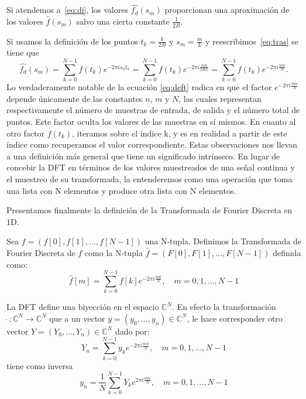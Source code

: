 \noindent Si atendemos a~\eqref{eq:di}, los valores $\widehat{f_d}(s_m)$ proporcionan una aproximación de los valores $\widehat{f}(s_m)$ salvo una cierta constante  $\frac{1}{2B}$.

\noindent Si usamos la definición de los puntos $t_k = \frac{k}{2B}$ y $s_m = \frac{m}{L}$ y reescribimos~\eqref{eq:tras} se tiene que 
\begin{equation}\label{eq:deft}
     \widehat{f_d}(s_m) = \sum_{k=0}^{N-1} f(t_k) e^{-2\pi i s_n t_k} = \sum_{k=0}^{N-1} f(t_k) e^{-2\pi i \frac{nm}{2BL}} = \sum_{k=0}^{N-1} f(t_k) e^{-2\pi i \frac{nm}{N}}.
\end{equation}
Lo verdaderamente notable de la ecuación \eqref{eq:deft} radica en que el factor $e^{-2\pi i \frac{nm}{N}}$ depende únicamente de las constantes $n$, $m$ y $N$, las cuales representan respectivamente el número de muestras de entrada, de salida y el número total de puntos. Este factor oculta los valores de las muestras en sí mismos. En cuanto al otro factor $f(t_k)$, iteramos sobre el índice k, y es en realidad a partir de este índice como recuperamos el valor correspondiente. Estas observaciones nos llevan a una definición más general que tiene un significado intrínseco. En lugar de concebir la DFT en términos de los valores muestreados de una señal continua y el muestreo de su transformada, la entenderemos como una operación que toma una lista con N elementos y produce otra lista con N elementos. 

\noindent Presentamos finalmente la definición de la Transformada de Fourier Discreta en 1D.

\begin{definicion}  \label{def:tfd} 
Sea $f = (f[0],f[1],\ldots,f[N-1])$ una N-tupla. Definimos la Transformada de Fourier Discreta de $f$ como la N-tupla $\widehat{f} = (F[0],F[1],\ldots,F[N-1])$ definida como:
\begin{equation}
    \widehat{f}[m] = \sum_{k=0}^{N-1} f[k] e^{-2\pi i \frac{mk}{N}}, \quad m = 0,1,\ldots,N-1
\end{equation}
\end{definicion}


\noindent La DFT define una biyección en el espacio $\mathbb{C}^N$. En efecto la transformación $\,\widehat{} \,: \mathbb{C}^N \rightarrow \mathbb{C}^N$ que a un vector $y = (y_0, \ldots, y_n) \in \mathbb{C}^N$, le hace corresponder otro vector $Y = (Y_0, \ldots, Y_n) \in \mathbb{C}^N$ dado por:
\begin{equation}
    Y_n = \sum_{k=0}^{N-1} y_k e^{-2\pi i \frac{mn}{N}}, \quad m = 0,1,\ldots,N-1
\end{equation}
tiene como inversa 
\begin{equation}
    y_n = \frac{1}{N}\sum_{k=0}^{N-1} Y_k e^{2\pi i \frac{mn}{N}}, \quad m = 0,1,\ldots,N-1
\end{equation}

